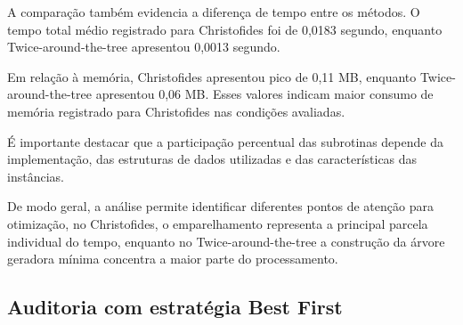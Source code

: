 \documentclass[12pt]{article}
\begin{document}
A comparação também evidencia a diferença de tempo entre os métodos. O tempo total médio registrado para Christofides foi de 0,0183 segundo, enquanto Twice-around-the-tree apresentou 0,0013 segundo.

Em relação à memória, Christofides apresentou pico de 0,11 MB, enquanto Twice-around-the-tree apresentou 0,06 MB. Esses valores indicam maior consumo de memória registrado para Christofides nas condições avaliadas.

É importante destacar que a participação percentual das subrotinas depende da implementação, das estruturas de dados utilizadas e das características das instâncias.

De modo geral, a análise permite identificar diferentes pontos de atenção para otimização, no Christofides, o emparelhamento representa a principal parcela individual do tempo, enquanto no Twice-around-the-tree a construção da árvore geradora mínima concentra a maior parte do processamento.


\begin{table}[H]
\centering
\caption{Análise de subrotinas: tempo médio, participação percentual e pico de RAM.}
\label{tab:subrotinas_tsp}
\small
\setlength{\tabcolsep}{3pt}
\end{table}





\subsection{Auditoria com estratégia Best First}
\end{document}
